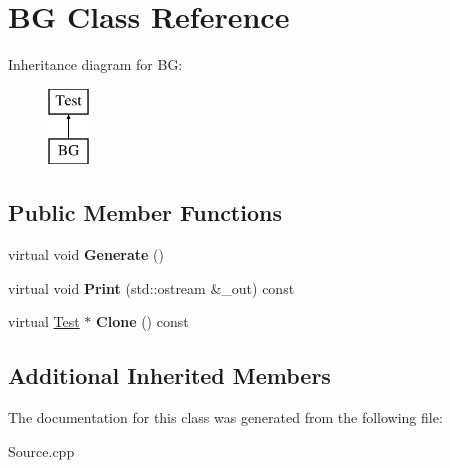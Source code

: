 \hypertarget{class_b_g}{}\section{BG Class Reference}
\label{class_b_g}
Inheritance diagram for BG\+:\begin{figure}[H]
\begin{center}
\leavevmode
\includegraphics[height=2.000000cm]{class_b_g}
\end{center}
\end{figure}
\subsection*{Public Member Functions}
\begin{DoxyCompactItemize}
\item 
\mbox{\label{class_b_g_a8f4a9870c4f6cd7f27160200f2f7560b}} 
virtual void {\bfseries Generate} ()
\item 
\mbox{\label{class_b_g_aff8adc384fc9aef8d689e640ba66f073}} 
virtual void {\bfseries Print} (std\+::ostream \&\+\_\+out) const
\item 
\mbox{\label{class_b_g_a4ab2348538cec6d125e3d5e7872f32ff}} 
virtual \hyperlink{class_test}{Test} $\ast$ {\bfseries Clone} () const
\end{DoxyCompactItemize}
\subsection*{Additional Inherited Members}


The documentation for this class was generated from the following file\+:\begin{DoxyCompactItemize}
\item 
Source.\+cpp\end{DoxyCompactItemize}
